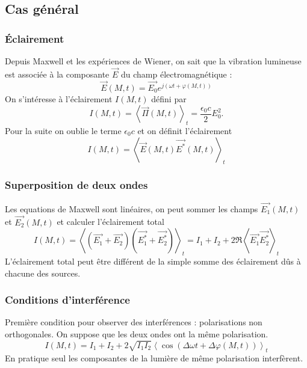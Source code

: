 \subsection{Cas général}

\subsubsection{Éclairement}

Depuis Maxwell et les expériences de Wiener, on sait que la vibration lumineuse est associée à la composante $\overrightarrow{E}$ du champ électromagnétique :
\begin{equation}
\overrightarrow{E}(M,t) = \overrightarrow{E_0}e^{j(\omega t +\varphi(M,t))}
\end{equation}
On s'intéresse à l'éclairement $I(M,t)$ défini par
\begin{equation}
I(M,t) = \left< \overrightarrow{\Pi}(M,t)\right>_t = \frac{\epsilon_0 c}{2}E_0^2.
\end{equation}
Pour la suite on oublie le terme $\epsilon_0 c$ et on définit l'éclairement
\begin{equation}
I(M,t) = \left< \overrightarrow{E}(M,t) \overrightarrow{E^*}(M,t)\right>_t
\end{equation}

\subsubsection{Superposition de deux ondes}

Les equations de Maxwell sont linéaires, on peut sommer les champs $\overrightarrow{E_1}(M,t)$ et $\overrightarrow{E_2}(M,t)$ et calculer l'éclairement total
\begin{equation}
I(M,t) = \left< (\overrightarrow{E_1} + \overrightarrow{E_2})(\overrightarrow{E_1^*} + \overrightarrow{E_2^*}) \right>_t = I_1 + I_2 + 2\Re\left< \overrightarrow{E_1} \overrightarrow{E_2^*} \right>_t 
\end{equation}
L'éclairement total peut être différent de la simple somme des éclairement dûs à chacune des sources.

\subsubsection{Conditions d'interférence}

Première condition pour observer des interférences : polarisations non orthogonales.
On suppose que les deux ondes ont la même polarisation.
\begin{equation}
I(M,t)= I_1 + I_2 + 2\sqrt{I_1I_2}\left< \cos(\Delta\omega t + \Delta\varphi(M,t)) \right>_t
\end{equation}
En pratique seul les composantes de la lumière de même polarisation interfèrent.


